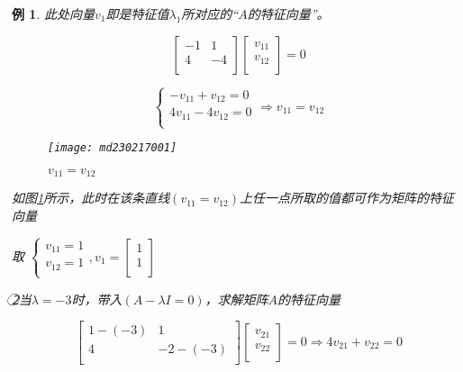 \documentclass[12pt, a4paper, oneside]{ctexbook}
\newtheorem{example}[theorem]{例}
\begin{document}
\begin{example}
    此处向量$v_1$即是特征值$\lambda_1$所对应的“$A$的特征向量”。

    $$
    \left[
        \begin{matrix}
            -1 & 1 \\
            4 & -4 \\
        \end{matrix}
    \right]
    \left[
        \begin{matrix}
            v_{11} \\
            v_{12} \\
        \end{matrix}
    \right]=0
    $$

    $$
    \begin{cases}
        -v_{11}+v_{12}=0 \\
        4v_{11}-4v_{12}=0 \\
    \end{cases}
    \Rightarrow v_{11}=v_{12}
    $$

    \begin{figure}[H]
        \centering
        \texttt{[image: md230217001]}
        \caption{$v_{11}=v_{12}$}
        \label{md230217001}
    \end{figure}
       

    如图\ref{md230217001}所示，此时在该条直线$\left(v_{11}=v_{12}\right)$上任一点所取的值都可作为矩阵的特征向量

    
    取
    $
    \begin{cases}
        v_{11}=1 \\
        v_{12}=1 \\
    \end{cases},
    v_1=
    \left[
        \begin{matrix}
            1 \\ 1 \\
        \end{matrix}
    \right]
    $

    \textcircled{2}当$\lambda=-3$时，带入$(A-\lambda I=0)$，求解矩阵$A$的特征向量

    $$
    \left[
        \begin{matrix}
            1-(-3) & 1 \\
            4 & -2-(-3) \\
        \end{matrix}
    \right]
    \left[
        \begin{matrix}
            v_{21} \\ v_{22} \\
        \end{matrix}
    \right]=0
    \Rightarrow
    4v_{21}+v_{22}=0
    $$


\end{example}
\end{document}
